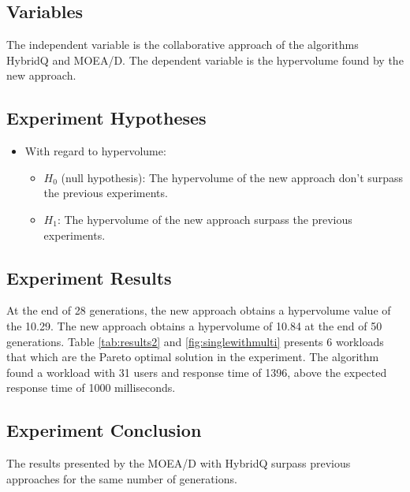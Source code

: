 \documentclass[espaco=umemeio,chapter=TITLE,twoside,openright]{abnt}
\begin{document}
\subsection{Variables}

The independent variable is the collaborative approach of the algorithms HybridQ and MOEA/D. The dependent variable is the hypervolume found by the new approach.

\subsection{Experiment Hypotheses}

\begin{itemize}
\item With regard to hypervolume:
\begin{itemize}
\item $H_{0}$ (null hypothesis): The hypervolume of the new approach don't surpass the previous experiments.
\item $H_{1}$: The hypervolume of the new approach surpass the previous experiments.
\end{itemize}
\end{itemize}


\subsection{Experiment Results}

At the end of 28 generations, the new approach obtains a hypervolume value of the 10.29. The new approach obtains a hypervolume of 10.84 at the end of 50 generations. Table \ref{tab:results2} and \ref{fig:singlewithmulti} presents 6 workloads that which are the Pareto optimal solution in the experiment. The algorithm found a workload with 31 users and response time of 1396, above the expected response time of 1000 milliseconds.

\subsection{Experiment Conclusion}

The results presented by the MOEA/D with HybridQ surpass previous approaches for the same number of generations.
\end{document}
